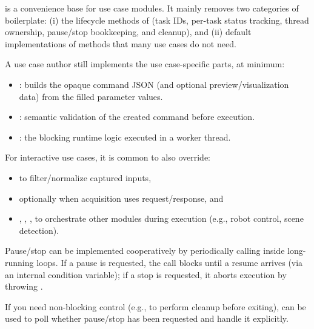  is a convenience base for use case modules. It mainly removes two categories of boilerplate:
(i) the  lifecycle methods of  (task IDs, per-task status tracking, thread ownership, pause/stop bookkeeping, and  cleanup), and
(ii) default implementations of  methods that many use cases do not need.

A use case author still implements the use case-specific parts, at minimum:
\begin{itemize}
    \item {}: builds the opaque command JSON (and optional preview/visualization data) from the filled parameter values.
    \item {}: semantic validation of the created command before execution.
    \item {}: the blocking runtime logic executed in a worker thread.
\end{itemize}

For interactive use cases, it is common to also override:
\begin{itemize}
    \item {} to filter/normalize captured inputs,
    \item optionally  when  acquisition uses request/response, and
    \item {}, , ,  to orchestrate other modules during execution (e.g., robot control, scene detection).
\end{itemize}

Pause/stop can be implemented cooperatively by periodically calling  inside long-running loops. If a pause is requested, the call blocks until a resume arrives (via an internal condition variable); if a stop is requested, it aborts execution by throwing .

If you need non-blocking control (e.g., to perform cleanup before exiting),  can be used to poll whether pause/stop has been requested and handle it explicitly.

